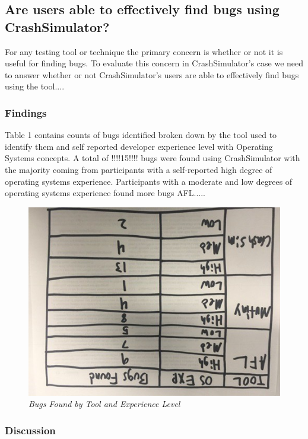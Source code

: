 \subsection{Are users able to effectively find bugs using CrashSimulator?}

For any testing tool or technique the primary concern is whether or not it
is useful for finding bugs.  To evaluate this concern in CrashSimulator's
case we need to answer whether or not CrashSimulator's users are able to
effectively find bugs using the tool....


\subsubsection{Findings}

Table 1 contains counts of bugs identified broken down by the tool used to
identify them and self reported developer experience level with Operating
Systems concepts. A total of !!!!15!!!! bugs were found using
CrashSimulator with the majority coming from participants with a
self-reported high degree of operating systems experience.  Participants
with a moderate and low degrees of operating systems experience found more
bugs AFL.....

\begin{figure}[t]
  \center{}
  \includegraphics[scale=.5]{images/table1}
  \caption{\emph{Bugs Found by Tool and Experience Level}}
  \label{fig-tool-exp}
\end{figure}


\subsubsection{Discussion}

